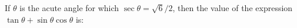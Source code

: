 \documentclass{ximera}
\author{Ivo Terek}
\begin{document}
\begin{exercise}
  If $\theta$ is the acute angle for which $\sec\theta=\sqrt{6}/2$, then the value of the expression $\tan\theta+\sin\theta\cos\theta$ is:

  \begin{multipleChoice}
  \end{multipleChoice}

\end{exercise}
\end{document}
